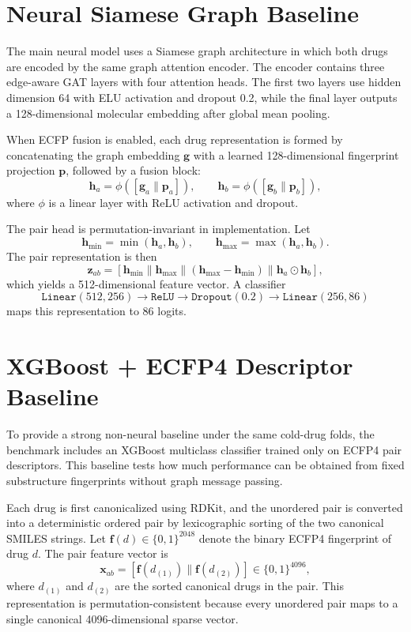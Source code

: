 \section{Neural Siamese Graph Baseline}
The main neural model uses a Siamese graph architecture in which both drugs are encoded by the same graph attention encoder. The encoder contains three edge-aware GAT layers with four attention heads. The first two layers use hidden dimension 64 with ELU activation and dropout 0.2, while the final layer outputs a 128-dimensional molecular embedding after global mean pooling.

When ECFP fusion is enabled, each drug representation is formed by concatenating the graph embedding \(\mathbf{g}\) with a learned 128-dimensional fingerprint projection \(\mathbf{p}\), followed by a fusion block:
\begin{equation}
\mathbf{h}_a = \phi([\mathbf{g}_a \| \mathbf{p}_a]), \qquad
\mathbf{h}_b = \phi([\mathbf{g}_b \| \mathbf{p}_b]),
\end{equation}
where \(\phi\) is a linear layer with ReLU activation and dropout.

The pair head is permutation-invariant in implementation. Let
\begin{equation}
\mathbf{h}_{\min}=\min(\mathbf{h}_a,\mathbf{h}_b), \qquad
\mathbf{h}_{\max}=\max(\mathbf{h}_a,\mathbf{h}_b).
\end{equation}
The pair representation is then
\begin{equation}
\mathbf{z}_{ab}=
[\mathbf{h}_{\min} \| \mathbf{h}_{\max} \| (\mathbf{h}_{\max}-\mathbf{h}_{\min}) \| \mathbf{h}_a \odot \mathbf{h}_b],
\end{equation}
which yields a 512-dimensional feature vector. A classifier
\[
\texttt{Linear}(512,256)\rightarrow\texttt{ReLU}\rightarrow\texttt{Dropout}(0.2)\rightarrow\texttt{Linear}(256,86)
\]
maps this representation to 86 logits.

\section{XGBoost + ECFP4 Descriptor Baseline}
To provide a strong non-neural baseline under the same cold-drug folds, the benchmark includes an XGBoost multiclass classifier trained only on ECFP4 pair descriptors. This baseline tests how much performance can be obtained from fixed substructure fingerprints without graph message passing.

Each drug is first canonicalized using RDKit, and the unordered pair is converted into a deterministic ordered pair by lexicographic sorting of the two canonical SMILES strings. Let \(\mathbf{f}(d)\in\{0,1\}^{2048}\) denote the binary ECFP4 fingerprint of drug \(d\). The pair feature vector is
\begin{equation}
\mathbf{x}_{ab} = [\mathbf{f}(d_{(1)}) \| \mathbf{f}(d_{(2)})] \in \{0,1\}^{4096},
\end{equation}
where \(d_{(1)}\) and \(d_{(2)}\) are the sorted canonical drugs in the pair. This representation is permutation-consistent because every unordered pair maps to a single canonical 4096-dimensional sparse vector.


